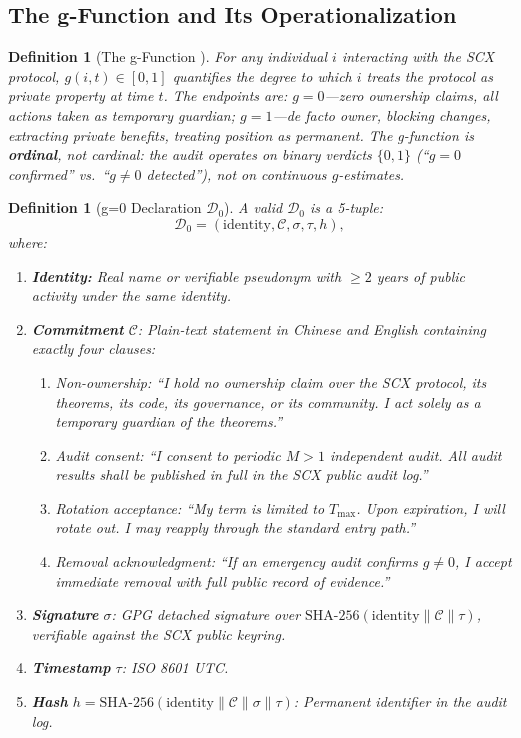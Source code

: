 \documentclass[12pt,a4paper]{article}
\newtheorem{definition}[theorem]{Definition}
\theoremstyle{definition}
\newcommand{\gzero}{g=0}
\newcommand{\gnonzero}{g \neq 0}
\newcommand{\GzeroDecl}{\mathcal{D}_{0}}
\begin{document}
\subsection{The g-Function and Its Operationalization}
\begin{definition}[The g-Function ]
\label{def:g_function}
For any individual $i$ interacting with the SCX protocol, $g(i, t) \in [0, 1]$ quantifies the degree to which $i$ treats the protocol as private property at time $t$. The endpoints are: $g = 0$---zero ownership claims, all actions taken as temporary guardian; $g = 1$---de facto owner, blocking changes, extracting private benefits, treating position as permanent. The g-function is \textbf{ordinal}, not cardinal: the audit operates on binary verdicts $\{0, 1\}$ (``$\gzero$ confirmed'' vs.\ ``$\gnonzero$ detected''), not on continuous $g$-estimates.
\end{definition}
\begin{definition}[\gzero{} Declaration $\GzeroDecl$]
\label{def:gzero_decl}
A valid $\GzeroDecl$ is a 5-tuple:
\begin{equation}
    \GzeroDecl = (\text{identity}, \mathcal{C}, \sigma, \tau, h),
    \label{eq:gzero_tuple}
\end{equation}
where:
\begin{enumerate}[label=(\roman*)]
    \item \textbf{Identity:} Real name or verifiable pseudonym with $\geq 2$ years of public activity under the same identity.
    \item \textbf{Commitment} $\mathcal{C}$: Plain-text statement in Chinese and English containing exactly four clauses:
    \begin{enumerate}
        \item \textit{Non-ownership:} ``I hold no ownership claim over the SCX protocol, its theorems, its code, its governance, or its community. I act solely as a temporary guardian of the theorems.''
        \item \textit{Audit consent:} ``I consent to periodic $M>1$ independent audit. All audit results shall be published in full in the SCX public audit log.''
        \item \textit{Rotation acceptance:} ``My term is limited to $T_{\max}$. Upon expiration, I will rotate out. I may reapply through the standard entry path.''
        \item \textit{Removal acknowledgment:} ``If an emergency audit confirms $\gnonzero$, I accept immediate removal with full public record of evidence.''
    \end{enumerate}
    \item \textbf{Signature} $\sigma$: GPG detached signature over $\text{SHA-256}(\text{identity} \| \mathcal{C} \| \tau)$, verifiable against the SCX public keyring.
    \item \textbf{Timestamp} $\tau$: ISO 8601 UTC.
    \item \textbf{Hash} $h = \text{SHA-256}(\text{identity} \| \mathcal{C} \| \sigma \| \tau)$: Permanent identifier in the audit log.
\end{enumerate}
\end{definition}
\end{document}
